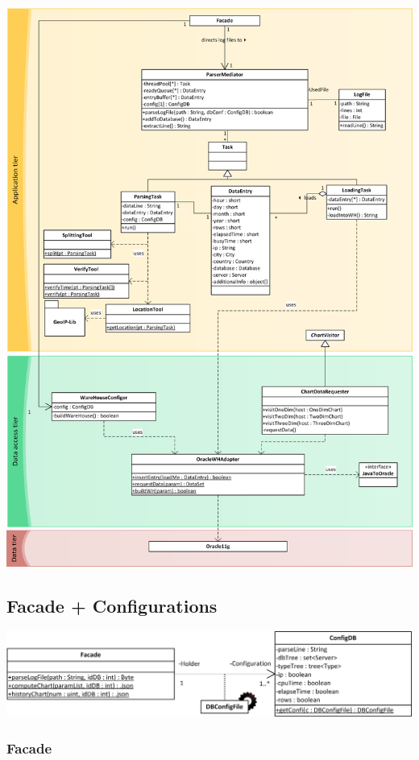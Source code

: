 \begin{center}
\includegraphics[width=0.9\linewidth]{Pictures/AppTierDia2.png}
\end{center}  

\subsection{Facade + Configurations}

\begin{center}
\includegraphics{Pictures/Parts/FacadeConfi.png}
\end{center}   

\subsubsection*{Facade}
